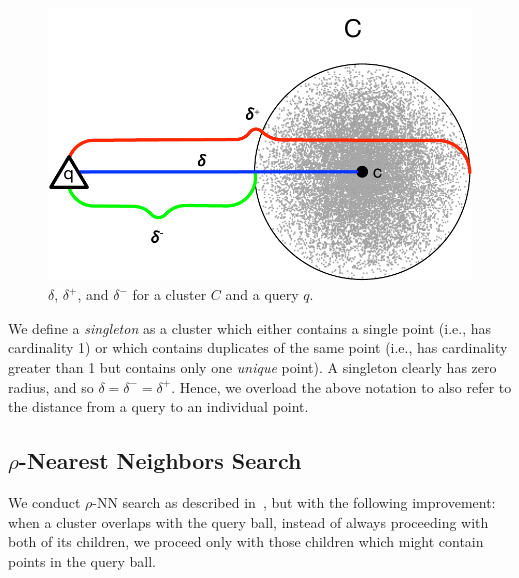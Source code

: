 \begin{figure}[ht!]
    \centering
    \includegraphics[scale=0.8]{images/geometry/deltas.pdf}
    \caption{{\color{blue}$\delta$}, {\color{red}$\delta^{+}$}, and {\color{green}$\delta^{-}$} for a cluster $C$ and a query $q$.}
    \label{fig:methods:deltas}
\end{figure}

We define a \emph{singleton} as a cluster which either contains a single point (i.e., has cardinality 1) or which contains duplicates of the same point (i.e., has cardinality greater than 1 but contains only one \emph{unique} point).
A singleton clearly has zero radius, and so $\delta = \delta^{-} = \delta^{+}$.
Hence, we overload the above notation to also refer to the distance from a query to an individual point.


\subsection{\texorpdfstring{$\rho$}{p}-Nearest Neighbors Search}
\label{sec:methods:rnn-search}

We conduct $\rho$-NN search as described in~\cite{ishaq2019clustered}, but with the following improvement:
when a cluster overlaps with the query ball, instead of always proceeding with both of its children, we proceed only with those children which might contain points in the query ball.

